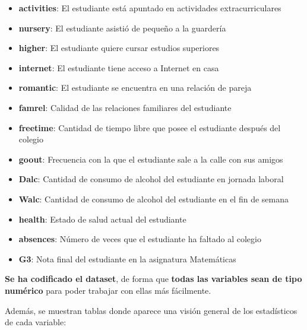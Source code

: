 \documentclass[a4paper, 11pt]{article}
\begin{document}
\begin{itemize}
\item \textbf{activities}: El estudiante está apuntado en actividades extracurriculares
\item \textbf{nursery}: El estudiante asistió de pequeño a la guardería
\item \textbf{higher}: El estudiante quiere cursar estudios superiores
\item \textbf{internet}: El estudiante tiene acceso a Internet en casa
\item \textbf{romantic}: El estudiante se encuentra en una relación de pareja
\item \textbf{famrel}: Calidad de las relaciones familiares del estudiante
\item \textbf{freetime}: Cantidad de tiempo libre que posee el estudiante después del colegio
\item \textbf{goout}: Frecuencia con la que el estudiante sale a la calle con sus amigos
\item \textbf{Dalc}: Cantidad de consumo de alcohol del estudiante en jornada laboral
\item \textbf{Walc}: Cantidad de consumo de alcohol del estudiante en el fin de semana
\item \textbf{health}: Estado de salud actual del estudiante
\item \textbf{absences}: Número de veces que el estudiante ha faltado al colegio
\item \textbf{G3}: Nota final del estudiante en la asignatura Matemáticas
\end{itemize}

\textbf{Se ha codificado el dataset}, de forma que \textbf{todas las variables sean de tipo numérico} para poder trabajar con ellas más fácilmente.

Además, se muestran tablas donde aparece una visión general de los estadísticos de cada variable:
\end{document}
